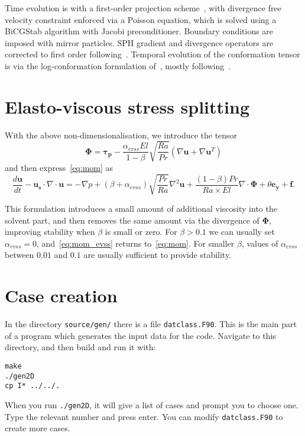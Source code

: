 \documentclass[notitlepage]{revtex4-2}
\begin{document}
Time evolution is with a first-order projection scheme~\cite{chorin_1968}, with divergence free velocity constraint enforced via a Poisson equation, which is solved using a BiCGStab algorithm with Jacobi preconditioner. Boundary conditions are imposed with mirror particles. SPH gradient and divergence operators are corrected to first order following~\cite{bonet_lok}. Temporal evolution of the conformation tensor is via the log-conformation formulation of~\cite{fattal_2004,fattal_2005}, mostly following~\cite{lopez_2019}.

\section{Elasto-viscous stress splitting}

With the above non-dimensionalisation, we introduce the tensor
\begin{equation}\bm{\Phi}=\bm{\tau_{p}}-\frac{\alpha_{evss}El}{1-\beta}\sqrt{\frac{Ra}{Pr}}\left(\nabla\bm{u}+\nabla\bm{u}^{T}\right)\end{equation}
and then express~\eqref{eq:mom} as
\begin{equation}\frac{d\bm{u}}{dt}-\bm{u_{s}}\cdot\nabla\cdot\bm{u}=-\nabla{p}+\left(\beta+\alpha_{evss}\right)\sqrt{\frac{Pr}{Ra}}\nabla^{2}\bm{u}+\frac{\left(1-\beta\right)Pr}{Ra\times{El}}\nabla\cdot\bm{\Phi}+\theta\bm{e_{y}}+\bm{f}\label{eq:mom_evss}.\end{equation}

This formulation introduces a small amount of additional viscosity into the solvent part, and then removes the same amount via the divergence of $\bm{\Phi}$, improving stability when $\beta$ is small or zero. For $\beta>0.1$ we can usually set $\alpha_{evss}=0$, and~\eqref{eq:mom_evss} returns to~\eqref{eq:mom}. For smaller $\beta$, values of $\alpha_{evss}$ between $0.01$ and $0.1$ are usually sufficient to provide stability.


\section{Case creation}\label{case}

In the directory \texttt{source/gen/} there is a file \texttt{datclass.F90}. This is the main part of a program which generates the input data for the code. Navigate to this directory, and then build and run it with:
\begin{verbatim}
make
./gen2D
cp I* ../../.
\end{verbatim}
When you run \texttt{./gen2D}, it will give a list of cases and prompt you to choose one. Type the relevant number and press enter. You can modify \verb|datclass.F90| to create more cases.
\end{document}
